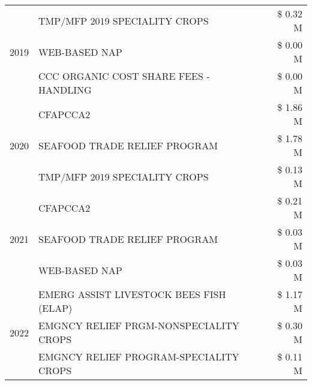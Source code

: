 \begin{tabular}{llr}
\cline{1-3}
\multirow[t]{3}{*}{2019} & TMP/MFP 2019 SPECIALITY CROPS & \$ 0.32 M \\
 & WEB-BASED NAP & \$ 0.00 M \\
 & CCC ORGANIC COST SHARE FEES - HANDLING & \$ 0.00 M \\
\cline{1-3}
\multirow[t]{3}{*}{2020} & CFAPCCA2 & \$ 1.86 M \\
 & SEAFOOD TRADE RELIEF PROGRAM & \$ 1.78 M \\
 & TMP/MFP 2019 SPECIALITY CROPS & \$ 0.13 M \\
\cline{1-3}
\multirow[t]{3}{*}{2021} & CFAPCCA2 & \$ 0.21 M \\
 & SEAFOOD TRADE RELIEF PROGRAM & \$ 0.03 M \\
 & WEB-BASED NAP & \$ 0.03 M \\
\cline{1-3}
\multirow[t]{3}{*}{2022} & EMERG ASSIST LIVESTOCK BEES FISH (ELAP) & \$ 1.17 M \\
 & EMGNCY RELIEF PRGM-NONSPECIALITY CROPS & \$ 0.30 M \\
 & EMGNCY RELIEF PROGRAM-SPECIALITY CROPS & \$ 0.11 M \\
\cline{1-3}
\bottomrule
\end{tabular}
